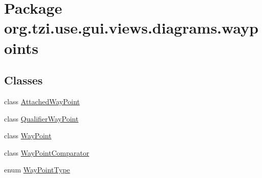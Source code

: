 \hypertarget{namespaceorg_1_1tzi_1_1use_1_1gui_1_1views_1_1diagrams_1_1waypoints}{\section{Package org.\-tzi.\-use.\-gui.\-views.\-diagrams.\-waypoints}
\label{namespaceorg_1_1tzi_1_1use_1_1gui_1_1views_1_1diagrams_1_1waypoints}
}
\subsection*{Classes}
\begin{DoxyCompactItemize}
\item 
class \hyperlink{classorg_1_1tzi_1_1use_1_1gui_1_1views_1_1diagrams_1_1waypoints_1_1_attached_way_point}{Attached\-Way\-Point}
\item 
class \hyperlink{classorg_1_1tzi_1_1use_1_1gui_1_1views_1_1diagrams_1_1waypoints_1_1_qualifier_way_point}{Qualifier\-Way\-Point}
\item 
class \hyperlink{classorg_1_1tzi_1_1use_1_1gui_1_1views_1_1diagrams_1_1waypoints_1_1_way_point}{Way\-Point}
\item 
class \hyperlink{classorg_1_1tzi_1_1use_1_1gui_1_1views_1_1diagrams_1_1waypoints_1_1_way_point_comparator}{Way\-Point\-Comparator}
\item 
enum \hyperlink{enumorg_1_1tzi_1_1use_1_1gui_1_1views_1_1diagrams_1_1waypoints_1_1_way_point_type}{Way\-Point\-Type}
\end{DoxyCompactItemize}
